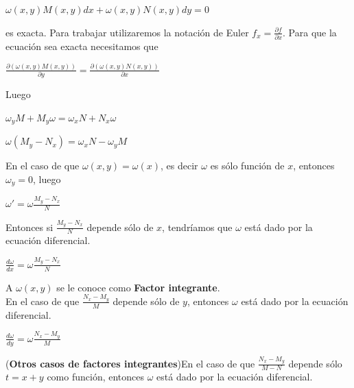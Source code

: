 \documentclass{article}
\theoremstyle{plain}
\theoremstyle{definition}
\begin{document}
\begin{center}
$\omega(x,y) M(x,y)dx+\omega(x,y) N(x,y)dy=0$
\end{center}

es exacta. Para trabajar utilizaremos la notación de Euler $f_x =\displaystyle \frac{\partial f}{\partial x}$. Para que la ecuación sea exacta necesitamos que

\begin{center}
$\displaystyle \frac{\partial \left( \omega(x,y)M(x,y) \right)}{\partial y} = \frac{\partial \left( \omega(x,y)N(x,y) \right)}{\partial x}  $
\end{center}

Luego

\begin{center}
$\displaystyle \omega_yM+M_y\omega=  \omega_xN+N_x\omega $
\end{center}

\begin{center}
$\displaystyle \omega(M_y-N_x)=  \omega_xN - \omega_y M$
\end{center}

En el caso de que $\omega(x,y)=\omega(x)$, es decir $\omega$ es sólo función de $x$, entonces $\omega_y=0$, luego


\begin{center}
$\displaystyle \omega'=  \omega \frac{M_y-N_x}{N}$
\end{center}


Entonces si $\displaystyle \frac{M_y-N_x}{N}$ depende sólo de $x$, tendríamos que $\omega$ está dado por la  ecuación diferencial.

\begin{center}
$\displaystyle \frac{d\omega}{dx}=  \omega \frac{M_y-N_x}{N}$
\end{center}



 A $\omega(x,y)$ se le conoce como \textbf{Factor integrante}. \\

En el caso de que $\displaystyle \frac{N_x-M_y}{M}$ depende sólo de $y$, entonces $\omega$ está dado por la  ecuación diferencial.

\begin{center}
$\displaystyle  \frac{d\omega}{dy}=  \omega \frac{N_x-M_y}{M}$
\end{center}

(\textbf{Otros casos de factores integrantes})En el caso de que $\displaystyle \frac{N_x-M_y}{M-N}$ depende sólo $t=x+y$ como función, entonces $\omega$ está dado por la  ecuación diferencial.
\end{document}
